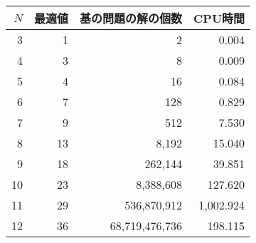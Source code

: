 \begin{tabular}{r|r|r|r}
 $N$ & 最適値&  基の問題の解の個数& CPU時間 \\
 \hline
 3&	1&	2&	0.004 \\
 4&	3&	8&	0.009 \\
 5&	4&	16&	0.084 \\
 6&	7&	128&	0.829 \\
 7&	9&	512&	7.530 \\
 8&	13&	8,192&	15.040 \\
 9&	18&	262,144&	39.851 \\
 10&	23&	8,388,608&	127.620 \\
 11&	29&	536,870,912&	1,002.924 \\
 12&	36&	68,719,476,736&	198.115 \\\hline
\end{tabular}

